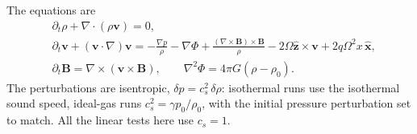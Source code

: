 \documentclass[11pt]{article}
\newcommand{\Om}{\Omega}
\begin{document}
The equations are
\begin{align}
  &\partial_t\rho + \nabla\cdot(\rho\mathbf v) = 0, \\
  &\partial_t\mathbf v + (\mathbf v\cdot\nabla)\mathbf v =
    -\frac{\nabla p}{\rho} - \nabla\Phi
    + \frac{(\nabla\times\mathbf B)\times\mathbf B}{\rho}
    - 2\Om\hat{\mathbf z}\times\mathbf v + 2q\Om^2 x\,\hat{\mathbf x}, \\
  &\partial_t\mathbf B = \nabla\times(\mathbf v\times\mathbf B), \qquad
    \nabla^2\Phi = 4\pi G(\rho - \rho_0).
\end{align}
The perturbations are isentropic, $\delta p = c_s^2\,\delta\rho$: isothermal runs use the
isothermal sound speed, ideal-gas runs $c_s^2 = \gamma p_0/\rho_0$, with the initial
pressure perturbation set to match. All the linear tests here use $c_s = 1$.
\end{document}
